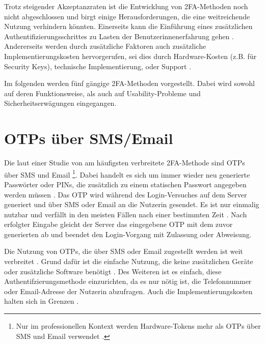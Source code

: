 Trotz steigender Akzeptanzraten ist die Entwicklung von \ac{2FA}-Methoden noch nicht abgeschlossen und birgt einige Herausforderungen, die eine weitreichende Nutzung verhindern könnten. Einerseits kann die Einführung eines zusätzlichen Authentifizierungsschrittes zu Lasten der Benutzerinnenerfahrung gehen \parencite{decristofaroComparativeUsability2014}. Andererseits werden durch zusätzliche Faktoren auch zusätzliche Implementierungskosten hervorgerufen, sei dies durch Hardware-Kosten (z.B. für Security Keys), technische Implementierung, oder Support \parencite{alsaleemMultiFactorAuthentication2021}.

\pskip
Im folgenden werden fünf gängige \ac{2FA}-Methoden vorgestellt. Dabei wird sowohl auf deren Funktionsweise, als auch auf Usability-Probleme und Sicherheitserwägungen eingegangen.

\section{\acsp{OTP} über SMS/Email}
\label{sec:otp}

Die laut einer Studie von \citeyear{decristofaroComparativeUsability2014} am häufigsten verbreitete \ac{2FA}-Methode sind \aclp{OTP} über SMS und Email \parencite{decristofaroComparativeUsability2014}\footnote{Nur im professionellen Kontext werden Hardware-Tokens mehr als \acp{OTP} über SMS und Email verwendet \parencite{decristofaroComparativeUsability2014}.}. Dabei handelt es sich um immer wieder neu generierte Passwörter oder PINs, die zusätzlich zu einem statischen Passwort angegeben werden müssen \parencite{geramiOneTimePasswords2016}. Das \ac{OTP} wird während des Login-Versuches auf dem Server generiert und über \acs{SMS} oder Email an die Nutzerin gesendet. Es ist nur einmalig nutzbar und verfällt in den meisten Fällen nach einer bestimmten Zeit \parencite{geramiOneTimePasswords2016}. Nach erfolgter Eingabe gleicht der Server das eingegebene \ac{OTP} mit dem zuvor generierten ab und beendet den Login-Vorgang mit Zulassung oder Abweisung.

Die Nutzung von \acp{OTP}, die über SMS oder Email zugestellt werden ist weit verbreitet \parencite{decristofaroComparativeUsability2014}. Grund dafür ist die einfache Nutzung, die keine zusätzlichen Geräte oder zusätzliche Software benötigt \parencite{abhishekComprehensiveStudy2013}. Des Weiteren ist es einfach, diese Authentifzierungsmethode einzurichten, da es nur nötig ist, die Telefonnummer oder Email-Adresse der Nutzerin abzufragen. Auch die Implementierungskosten halten sich in Grenzen \parencite{abhishekComprehensiveStudy2013}.

